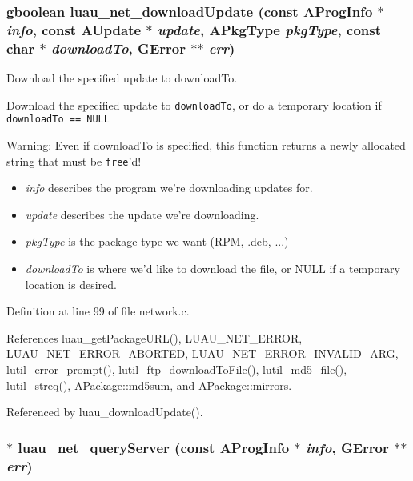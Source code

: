 \subsubsection{\setlength{\rightskip}{0pt plus 5cm}gboolean luau\_\-net\_\-download\-Update (const {\bf AProg\-Info} $\ast$ {\em info}, const {\bf AUpdate} $\ast$ {\em update}, {\bf APkg\-Type} {\em pkg\-Type}, const char $\ast$ {\em download\-To}, GError $\ast$$\ast$ {\em err})}\label{network_8h_a1}


Download the specified update to download\-To. 

Download the specified update to {\tt download\-To}, or do a temporary location if {\tt download\-To == NULL} \begin{Desc}
\item[Warning:]Even if download\-To is specified, this function returns a newly allocated string that must be {\tt free}'d!\end{Desc}
\begin{itemize}
\item {\em info\/} describes the program we're downloading updates for. \item {\em update\/} describes the update we're downloading. \item {\em pkg\-Type\/} is the package type we want (RPM, .deb, ...) \item {\em download\-To\/} is where we'd like to download the file, or NULL if a temporary location is desired. 
\end{itemize}


Definition at line 99 of file network.c.

References luau\_\-get\-Package\-URL(), LUAU\_\-NET\_\-ERROR, LUAU\_\-NET\_\-ERROR\_\-ABORTED, LUAU\_\-NET\_\-ERROR\_\-INVALID\_\-ARG, lutil\_\-error\_\-prompt(), lutil\_\-ftp\_\-download\-To\-File(), lutil\_\-md5\_\-file(), lutil\_\-streq(), APackage::md5sum, and APackage::mirrors.

Referenced by luau\_\-download\-Update().
\subsubsection{$\ast$ luau\_\-net\_\-query\-Server (const {\bf AProg\-Info} $\ast$ {\em info}, GError $\ast$$\ast$ {\em err})}\label{network_8h_a0}


